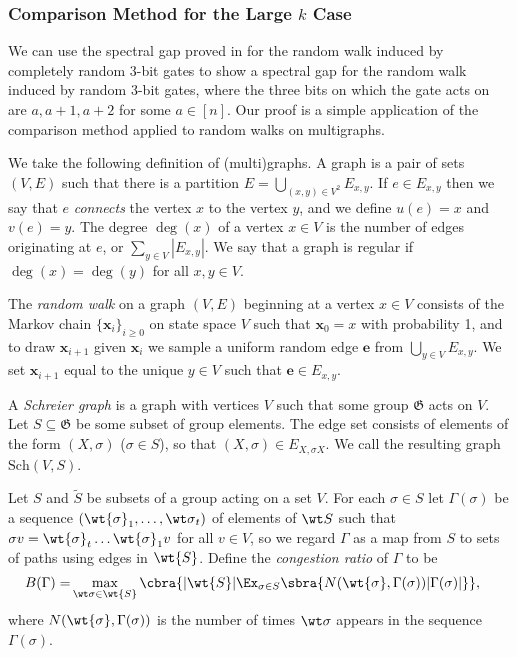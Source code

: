 \subsubsection{Comparison Method for the Large $k$ Case}
We can use the spectral gap proved in  for the random walk induced by completely random 3-bit gates to show a spectral gap for the random walk induced by random 3-bit gates, where the three bits on which the gate acts on are $a,a+1,a+2$ for some $a\in[n]$. Our proof is a simple application of the comparison method applied to random walks on multigraphs.

We take the following definition of (multi)graphs. A graph is a pair of sets $(V,E)$ such that there is a partition $E=\bigcup_{(x,y)\in V^2}E_{x,y}$. If $e\in E_{x,y}$ then we say that $e$ \textit{connects} the vertex $x$ to the vertex $y$, and we define $u(e)=x$ and $v(e)=y$. The degree $\deg(x)$ of a vertex $x\in V$ is the number of edges originating at $e$, or $\sum_{y\in V}|E_{x,y}|$. We say that a graph is regular if $\deg(x)=\deg(y)$ for all $x,y\in V$.

The \textit{random walk} on a graph $(V,E)$ beginning at a vertex $x\in V$ consists of the Markov chain $\{\bm{x}_i\}_{i\geq0}$ on state space $V$ such that $\bm{x}_0=x$ with probability 1, and to draw $\bm{x}_{i+1}$ given $\bm{x}_i$ we sample a uniform random edge $\bm{e}$ from $\bigcup_{y\in V}E_{x,y}$. We set $\bm{x}_{i+1}$ equal to the unique $y\in V$ such that $\bm{e}\in E_{x,y}$.

A \textit{Schreier graph} is a graph with vertices $V$ such that some group $\mathfrak{G}$ acts on $V$. Let $S\subseteq \mathfrak{G}$ be some subset of group elements. The edge set consists of elements of the form $(X,\sigma)$ ($\sigma\in S$), so that $(X,\sigma)\in E_{X,\sigma X}$. We call the resulting graph $\mathrm{Sch}(V,S)$.

\begin{definition}\label{def:congestion}
    Let $S$ and $\widetilde{S}$ be subsets of a group acting on a set $V$. For each ${\sigma}\in {S}$ let $\Gamma({\sigma})$ be a sequence $(\wt{\sigma}_1,\dots,{\wt\sigma}_t)$ of elements of $\wt S$ such that $\sigma v=\wt{\sigma}_t\dots \wt{\sigma}_1 v$ for all $v\in V$, so we regard $\Gamma$ as a map from $S$ to sets of paths using edges in $\wt{S}$. Define the \textit{congestion ratio} of $\Gamma$ to be
    \begin{align*}
        B({\Gamma})=&\max_{\wt\sigma\in \wt{S}}\cbra{|\wt{S}|\Ex_{\sigma\in S}\sbra{{N(\wt{\sigma},\Gamma(\sigma))|\Gamma({\sigma})|}}},
    \end{align*}
    where $N(\wt{\sigma},\Gamma(\sigma))$ is the number of times $\wt \sigma$ appears in the sequence $\Gamma(\sigma)$.
\end{definition}

